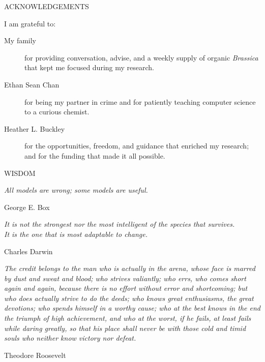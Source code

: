 \newpage
{}

\begin{center}
    ACKNOWLEDGEMENTS
\end{center}

\noindent I am grateful to:
\begin{description}
    \item[My family]
    	for providing conversation, advise, and a weekly supply of organic \textit{Brassica} that kept me focused during my research.
    \item[Ethan Sean Chan]
    	for being my partner in crime and for patiently teaching computer science to a curious chemist.
    \item[Heather L. Buckley]
    	for the opportunities, freedom, and guidance that enriched my research; and for the funding that made it all possible.
\end{description}

\vspace{5mm}
\begin{center}
    WISDOM 
\end{center}

\vspace{3mm}
\begin{flushright} 
    \textit{All models are wrong; some models are useful.} \\
    \begin{flushright}
        George E. Box
    \end{flushright}
\end{flushright}

\vspace{3mm}
    \begin{flushright}
        \textit{
            It is not the strongest nor the most intelligent of the species that survives. \\
            It is the one that is most adaptable to change.
        } \\
    \begin{flushright}
        Charles Darwin
    \end{flushright}
\end{flushright}

\vspace{3mm}
\begin{justify}
    \textit{
        The credit belongs to the man who is actually in the arena, whose face is marred by dust and sweat and blood; who strives valiantly; who errs, who comes short again and again, because there is no effort without error and shortcoming; but who does actually strive to do the deeds; who knows great enthusiasms, the great devotions; who spends himself in a worthy cause; who at the best knows in the end the triumph of high achievement, and who at the worst, if he fails, at least fails while daring greatly, so that his place shall never be with those cold and timid souls who neither know victory nor defeat.
    } \\
    \begin{flushright}
        Theodore Roosevelt
    \end{flushright}
\end{justify}